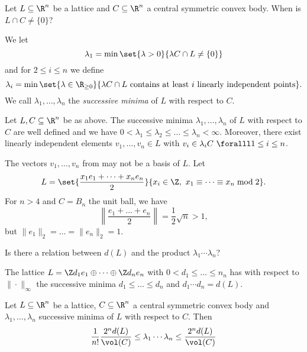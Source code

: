 Let \( L \subseteq \R^n \) be a lattice and \( C \subseteq \R^n \) a central symmetric convex body.
When is \( L \cap C \neq \{0\} \)?


\begin{defn*}
	We let
	\[ \lambda_1 = \min \set{\lambda > 0}{\lambda C \cap L \neq \{0\}} \]
	and for \( 2 \leq i \leq n \) we define
	\[ \lambda_i = \min \set{\lambda \in \R_{\geq 0}}{\lambda C \cap L \ \text{contains at least } i \ \text{linearly independent points}}. \]
	We call \( \lambda_1, \dotsc, \lambda_n \) the \emph{successive minima} of \( L \) with respect to \( C \).
\end{defn*}

\begin{lem}\label{thm:3.10}
	Let \( L, C \subseteq \R^n \) be as above.
	The successive minima \( \lambda_1, \dotsc, \lambda_n \) of \( L \) with respect to \( C \) are well defined and we have \( 0 < \lambda_1 \leq \lambda_2 \leq \dots \leq \lambda_n < \infty \).
	Moreover, there exist linearly independent elements \( v_1, \dotsc, v_n \in L \) with \( v_i \in \lambda_i C\ \foralll 1 \leq i \leq n \).
\end{lem}

\begin{cav*}
	The vectors \( v_1, \dotsc, v_n \) from  may not be a basis of \( L \).
	Let
	\[ L = \set{\frac{x_1 e_1 + \dots + x_n e_n}{2}}{x_i \in \Z,\ x_1 \equiv \dots \equiv x_n \bmod 2}. \]
	For \( n>4 \) and \( C = B_n \) the unit ball, we have
	\[ \left\| \frac{e_1 + \dots + e_n}{2} \right\| = \frac{1}{2} \sqrt{n} > 1, \]
	but \( \|e_1\|_2 = \dots = \|e_n\|_2 = 1 \).
\end{cav*}

\begin{frage*}
	Is there a relation between \( d(L) \) and the product \( \lambda_1 \dotsm \lambda_n \)?
\end{frage*}

\begin{exmp*}
	The lattice \( L = \Z d_1 e_1 \oplus \dots \oplus \Z d_n e_n \) with \( 0 < d_1 \leq \dots \leq n_n \) has with respect to \( \| \cdot \|_\infty \) the successive minima \( d_1 \leq \dots \leq d_n \) and \( d_1 \dotsm d_n = d(L) \).
\end{exmp*}

\begin{thmn}\label{thm:3.11}
	Let \( L \subseteq \R^n \) be a lattice, \( C \subseteq \R^n \) a central symmetric convex body and \( \lambda_1, \dotsc, \lambda_n \) successive minima of \( L \) with respect to \( C \).
	Then
	\[ \frac{1}{n!} \frac{2^n d(L)}{\vol(C)} \leq \lambda_1 \dotsm \lambda_n \leq \frac{2^n d(L)}{\vol(C)} \]
\end{thmn}